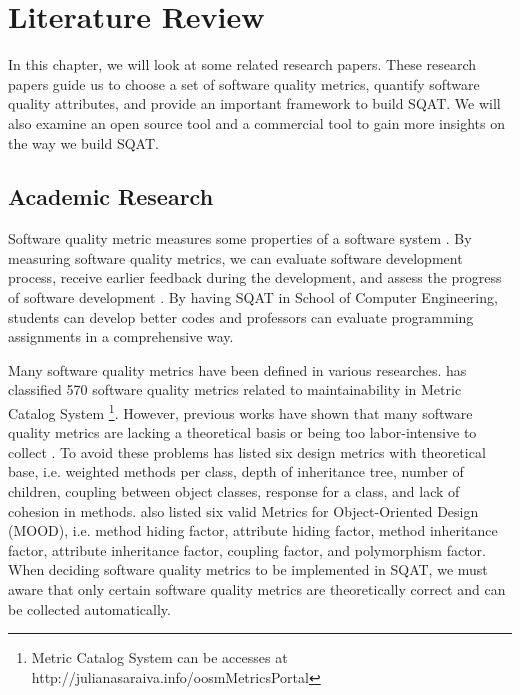 \chapter{Literature Review}

In this chapter, we will look at some related research papers. These research papers guide us to choose a set of software quality metrics, quantify software quality attributes, and provide an important framework to build SQAT. We will also examine an open source tool and a commercial tool to gain more insights on the way we build SQAT. 

\section{Academic Research}

Software quality metric measures some properties of a software system \cite[]{washizaki2007framework}. By measuring software quality metrics, we can evaluate software development process, receive earlier feedback during the development, and assess the progress of software development \cite[]{yi1994goal}. By having SQAT in School of Computer Engineering, students can develop better codes and professors can evaluate programming assignments in a comprehensive way. 

Many software quality metrics have been defined in various researches. \cite{de2015classifying} has classified 570 software quality metrics related to maintainability in Metric Catalog System \footnote{Metric Catalog System can be accesses at http://julianasaraiva.info/oosmMetricsPortal}. However, previous works have shown that many software quality metrics are lacking a theoretical basis \cite[]{vessey1984research} or being too labor-intensive to collect \cite[]{kemerer1993reliability}. To avoid these problems \cite{chidamber1994metrics} has listed six design metrics with theoretical base, i.e. weighted methods per class, depth of inheritance tree, number of children, coupling between object classes, response for a class, and lack of cohesion in methods. \cite{harrison1998evaluation} also listed six valid Metrics for Object-Oriented Design (MOOD), i.e. method hiding factor, attribute hiding factor, method inheritance factor, attribute inheritance factor, coupling factor, and polymorphism factor. When deciding software quality metrics to be implemented in SQAT, we must aware that only certain software quality metrics are theoretically correct and can be collected automatically.

